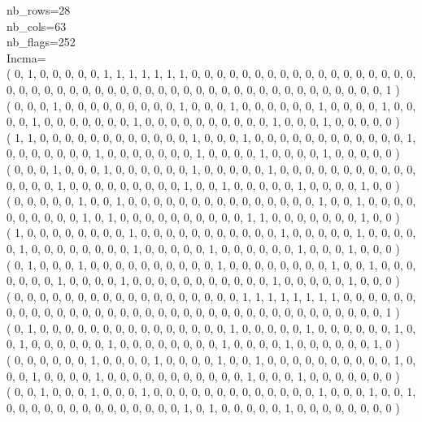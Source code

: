\documentclass{article}
\begin{document}
{nb\_rows=28\\
nb\_cols=63\\
nb\_flags=252\\
Incma=\\
( 0, 1, 0, 0, 0, 0, 0, 1, 1, 1, 1, 1, 1, 1, 0, 0, 0, 0, 0, 0, 0, 0, 0, 0, 0, 0, 0, 0, 0, 0, 0, 0, 0, 0, 0, 0, 0, 0, 0, 0, 0, 0, 0, 0, 0, 0, 0, 0, 0, 0, 0, 0, 0, 0, 0, 0, 0, 0, 0, 0, 0, 0, 1 )\\
( 0, 0, 0, 1, 0, 0, 0, 0, 0, 0, 0, 0, 0, 1, 0, 0, 0, 1, 0, 0, 0, 0, 0, 0, 1, 0, 0, 0, 0, 1, 0, 0, 0, 0, 1, 0, 0, 0, 0, 0, 0, 0, 1, 0, 0, 0, 0, 0, 0, 0, 0, 0, 0, 1, 0, 0, 0, 1, 0, 0, 0, 0, 0 )\\
( 1, 1, 0, 0, 0, 0, 0, 0, 0, 0, 0, 0, 0, 0, 1, 0, 0, 0, 1, 0, 0, 0, 0, 0, 0, 0, 0, 0, 0, 0, 0, 1, 0, 0, 0, 0, 0, 0, 0, 1, 0, 0, 0, 0, 0, 0, 0, 1, 0, 0, 0, 0, 1, 0, 0, 0, 0, 1, 0, 0, 0, 0, 0 )\\
( 0, 0, 0, 1, 0, 0, 0, 1, 0, 0, 0, 0, 0, 0, 1, 0, 0, 0, 0, 0, 1, 0, 0, 0, 0, 0, 0, 0, 0, 0, 0, 0, 0, 0, 0, 0, 1, 0, 0, 0, 0, 0, 0, 0, 0, 0, 1, 0, 0, 1, 0, 0, 0, 0, 0, 1, 0, 0, 0, 0, 1, 0, 0 )\\
( 0, 0, 0, 0, 0, 1, 0, 0, 1, 0, 0, 0, 0, 0, 0, 0, 0, 0, 0, 0, 0, 0, 0, 0, 1, 0, 0, 1, 0, 0, 0, 0, 0, 0, 0, 0, 0, 0, 1, 0, 1, 0, 0, 0, 0, 0, 0, 0, 0, 0, 0, 1, 1, 0, 0, 0, 0, 0, 0, 0, 1, 0, 0 )\\
( 1, 0, 0, 0, 0, 0, 0, 0, 0, 1, 0, 0, 0, 0, 0, 0, 0, 0, 0, 0, 0, 1, 0, 0, 0, 0, 0, 1, 0, 0, 0, 0, 0, 1, 0, 0, 0, 0, 0, 0, 0, 0, 1, 0, 0, 0, 0, 0, 1, 0, 0, 0, 0, 0, 0, 1, 0, 0, 0, 1, 0, 0, 0 )\\
( 0, 1, 0, 0, 0, 1, 0, 0, 0, 0, 0, 0, 0, 0, 0, 0, 1, 0, 0, 0, 0, 0, 0, 0, 0, 1, 0, 0, 1, 0, 0, 0, 0, 0, 0, 0, 1, 0, 0, 0, 0, 1, 0, 0, 0, 0, 0, 0, 0, 0, 0, 0, 0, 1, 0, 0, 0, 0, 0, 1, 0, 0, 0 )\\
( 0, 0, 0, 0, 0, 0, 0, 0, 0, 0, 0, 0, 0, 0, 0, 0, 0, 0, 1, 1, 1, 1, 1, 1, 1, 1, 0, 0, 0, 0, 0, 0, 0, 0, 0, 0, 0, 0, 0, 0, 0, 0, 0, 0, 0, 0, 0, 0, 0, 0, 0, 0, 0, 0, 0, 0, 0, 0, 0, 0, 0, 0, 1 )\\
( 0, 1, 0, 0, 0, 0, 0, 0, 0, 0, 0, 0, 0, 0, 0, 0, 0, 1, 0, 0, 0, 0, 0, 1, 0, 0, 0, 0, 0, 0, 1, 0, 0, 1, 0, 0, 0, 0, 0, 0, 1, 0, 0, 0, 0, 0, 0, 0, 0, 1, 0, 0, 0, 0, 1, 0, 0, 0, 0, 0, 0, 1, 0 )\\
( 0, 0, 0, 0, 0, 0, 1, 0, 0, 0, 0, 1, 0, 0, 0, 0, 1, 0, 0, 1, 0, 0, 0, 0, 0, 0, 0, 0, 0, 0, 1, 0, 0, 0, 1, 0, 0, 0, 0, 1, 0, 0, 0, 0, 0, 0, 0, 0, 0, 0, 0, 1, 0, 0, 0, 1, 0, 0, 0, 0, 0, 0, 0 )\\
( 0, 0, 1, 0, 0, 0, 1, 0, 0, 0, 1, 0, 0, 0, 0, 0, 0, 0, 0, 0, 0, 0, 0, 0, 1, 0, 0, 0, 1, 0, 0, 1, 0, 0, 0, 0, 0, 0, 0, 0, 0, 0, 0, 0, 0, 0, 1, 0, 1, 0, 0, 0, 0, 0, 1, 0, 0, 0, 0, 0, 0, 0, 0 )\\
}
\end{document}
